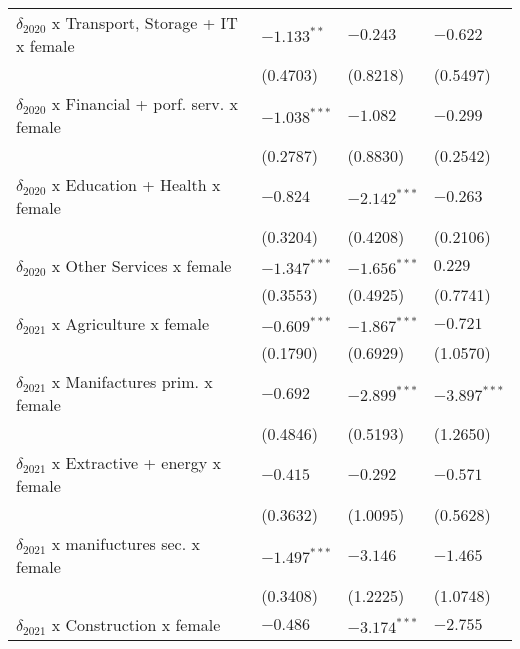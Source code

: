 \begin{tabular}{llll}
$\delta_{2020}$ x Transport, Storage + IT x female &      $-1.133^{**}$ &           $-0.243$ &           $-0.622$ \\
                                                   &           (0.4703) &           (0.8218) &           (0.5497) \\
$\delta_{2020}$ x Financial + porf. serv. x female &     $-1.038^{***}$ &           $-1.082$ &           $-0.299$ \\
                                                   &           (0.2787) &           (0.8830) &           (0.2542) \\
$\delta_{2020}$ x Education + Health x female      &           $-0.824$ &     $-2.142^{***}$ &           $-0.263$ \\
                                                   &           (0.3204) &           (0.4208) &           (0.2106) \\
$\delta_{2020}$ x Other Services x female          &     $-1.347^{***}$ &     $-1.656^{***}$ &            $0.229$ \\
                                                   &           (0.3553) &           (0.4925) &           (0.7741) \\
$\delta_{2021}$ x Agriculture x female             &     $-0.609^{***}$ &     $-1.867^{***}$ &           $-0.721$ \\
                                                   &           (0.1790) &           (0.6929) &           (1.0570) \\
$\delta_{2021}$ x Manifactures prim. x female      &           $-0.692$ &     $-2.899^{***}$ &     $-3.897^{***}$ \\
                                                   &           (0.4846) &           (0.5193) &           (1.2650) \\
$\delta_{2021}$ x Extractive + energy x female     &           $-0.415$ &           $-0.292$ &           $-0.571$ \\
                                                   &           (0.3632) &           (1.0095) &           (0.5628) \\
$\delta_{2021}$ x manifuctures sec. x female       &     $-1.497^{***}$ &           $-3.146$ &           $-1.465$ \\
                                                   &           (0.3408) &           (1.2225) &           (1.0748) \\
$\delta_{2021}$ x Construction x female            &           $-0.486$ &     $-3.174^{***}$ &           $-2.755$ \\

\end{tabular}
